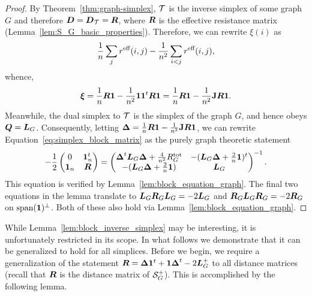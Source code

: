 \begin{proof}
By Theorem~\ref{thm:graph-simplex}, $\mathcal{T}$ is the inverse simplex of some graph $G$ and therefore $\vb*{D}=\vb*{D}_{\mathcal{T}}=\vb*{R}$, where $\vb*{R}$ is the effective resistance matrix (Lemma~\ref{lem:S_G_basic_properties}). Therefore, we can rewrite $\xi(i)$ as 
 \begin{align*}
\frac{1}{n}\sum_j r^{\textnormal{eff}}(i,j) - \frac{1}{n^2}\sum_{i<j}r^{\textnormal{eff}}(i,j),
\end{align*}
whence,
\begin{align*}
\vb*{\xi} = \frac{1}{n}\vb*{R}\vb{1} - \frac{1}{n^2} \vb{1} \vb{1}^t \vb*{R}\vb{1} = \frac{1}{n}\vb*{R}\vb{1} - \frac{1}{n^2} \vb{J} \vb*{R}\vb{1}.
\end{align*}
Meanwhile, the dual simplex to $\mathcal{T}$ is the simplex of the graph $G$, and hence obeys $\vb*{Q}=\vb*{L}_G$. Consequently, letting $\vb*{\Delta}=\frac{1}{n}\vb*{R}\vb{1} - \frac{1}{n^2} \vb{J} \vb*{R}\vb{1}$, we can rewrite Equation~\eqref{eq:simplex_block_matrix} as the purely graph theoretic statement  
\begin{equation*}
	-\frac{1}{2} \begin{pmatrix}
0 & \vb{1}_n^t \\ 
\vb{1}_n &  \vb*{R}
\end{pmatrix} = 
\begin{pmatrix}
\vb*{\Delta}^t \vb*{L}_G\vb*{\Delta} + \frac{4}{n^2}R^{\textnormal{tot}}_G & -(\vb*{L}_G\vb*{\Delta} + \frac{2}{n}\vb{1})^t \\
-(\vb*{L}_G\vb*{\Delta} + \frac{2}{n}\vb{1}) & \vb*{L}_G
\end{pmatrix}^{-1}.
\end{equation*}
This equation is verified by Lemma~\ref{lem:block_equation_graph}. The final two equations in  the lemma translate to $\vb*{L}_G\vb*{R}_G\vb*{L}_G=-2\vb*{L}_G$ and $\vb*{R}_G\vb*{L}_G\vb*{R}_G=-2\vb*{R}_G$ on $\textnormal{span}(\vb{1})^\perp$. Both of these also hold  via Lemma~\ref{lem:block_equation_graph}. 
\end{proof}


While Lemma~\ref{lem:block_inverse_simplex} may be interesting, it is unfortunately restricted in its scope. In what follows we demonstrate that it can be generalized to hold for all simplices. Before we begin, we require a generalization of the statement $\vb*{R}=\vb*{\Delta}\vb{1}^t+\vb{1}\vb*{\Delta}^t - 2\vb*{L}_G^+$ to all distance  matrices (recall  that $\vb*{R}$ is the  distance  matrix of $\mathcal{S}_G^+$). This is accomplished by  the following lemma. 


